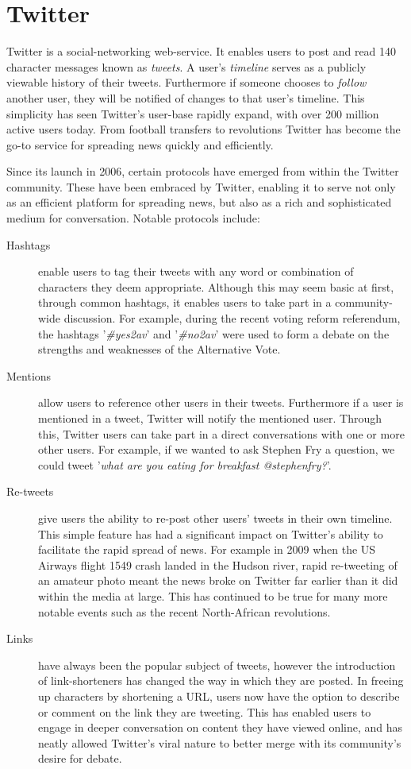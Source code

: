 \section{Twitter}
\label{background:twitter}

Twitter is a social-networking web-service. It enables users to post and read 140 character messages known as \emph{tweets}. A user's \emph{timeline} serves as a publicly viewable history of their tweets. Furthermore if someone chooses to \emph{follow} another user, they will be notified of changes to that user's timeline. This simplicity has seen Twitter's user-base rapidly expand, with over 200 million active users today. From football transfers to revolutions Twitter has become the go-to service for spreading news quickly and efficiently.

Since its launch in 2006, certain protocols have emerged from within the Twitter community. These have been embraced by Twitter, enabling it to serve not only as an efficient platform for spreading news, but also as a rich and sophisticated medium for conversation. Notable protocols include:

\begin{description}
	\item [Hashtags] enable users to tag their tweets with any word or combination of characters they deem appropriate. Although this may seem basic at first, through common hashtags, it enables users to take part in a community-wide discussion. For example, during the recent voting reform referendum, the hashtags '\emph{\#yes2av}' and '\emph{\#no2av}' were used to form a debate on the strengths and weaknesses of the Alternative Vote. 
	\item [Mentions] allow users to reference other users in their tweets. Furthermore if a user is mentioned in a tweet, Twitter will notify the mentioned user. Through this, Twitter users can take part in a direct conversations with one or more other users. For example, if we wanted to ask Stephen Fry a question, we could tweet '\emph{what are you eating for breakfast @stephenfry?}'.
	\item [Re-tweets] give users the ability to re-post other users' tweets in their own timeline. This simple feature has had a significant impact on Twitter's ability to facilitate the rapid spread of news. For example in 2009 when the US Airways flight 1549 crash landed in the Hudson river, rapid re-tweeting of an amateur photo meant the news broke on Twitter far earlier than it did within the media at large. This has continued to be true for many more notable events such as the recent North-African revolutions.
	\item [Links] have always been the popular subject of tweets, however the introduction of link-shorteners has changed the way in which they are posted. In freeing up characters by shortening a URL, users now have the option to describe or comment on the link they are tweeting. This has enabled users to engage in deeper conversation on content they have viewed online, and has neatly allowed Twitter's viral nature to better merge with its community's desire for debate.
\end{description}

